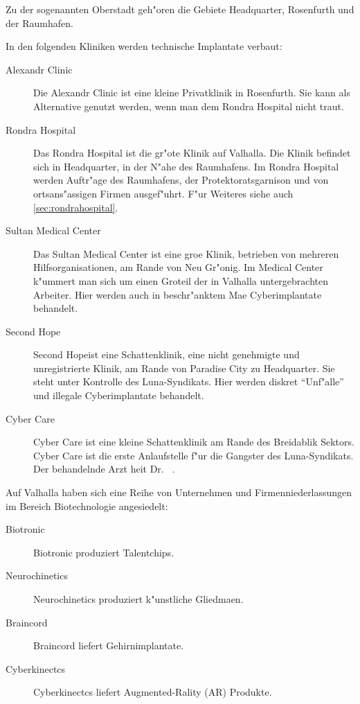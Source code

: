 Zu der sogenannten Oberstadt geh"oren die Gebiete Headquarter, Rosenfurth und der Raumhafen.


In den folgenden Kliniken werden technische Implantate verbaut:

\begin{description}
    \item [Alexandr Clinic] Die Alexandr Clinic ist eine kleine Privatklinik in Rosenfurth. Sie kann als Alternative genutzt werden, wenn 
        man dem Rondra Hospital nicht traut.
    \item [Rondra Hospital] Das Rondra Hospital ist die gr"o\3te Klinik auf Valhalla. Die Klinik befindet sich in Headquarter, in der N"ahe 
        des Raumhafens. Im Rondra Hospital werden Auftr"age des Raumhafens, der Protektoratsgarnison und von ortsans"assigen Firmen ausgef"uhrt. F"ur Weiteres siehe auch \cref{sec:rondrahospital}. 
    \item [Sultan Medical Center] Das Sultan Medical Center ist eine gro\3e Klinik, betrieben von mehreren Hilfsorganisationen, am Rande von 
        Neu Gr"onig. Im Medical Center k"ummert man sich um einen Gro\3teil der in Valhalla untergebrachten Arbeiter. Hier werden auch in beschr"anktem Ma\3e Cyberimplantate behandelt.
    \item [Second Hope] Second Hopeist eine Schattenklinik, eine nicht genehmigte und unregistrierte Klinik, am Rande von Paradise City zu 
        Headquarter. Sie steht unter Kontrolle des Luna-Syndikats. Hier werden diskret ``Unf"alle'' und illegale Cyberimplantate behandelt.
    \item [ Cyber Care] Cyber Care ist eine kleine Schattenklinik am Rande des Breidablik Sektors. Cyber Care ist die erste 
        Anlaufstelle f"ur die Gangster des Luna-Syndikats. Der behandelnde Arzt hei\3t Dr.~ .
\end{description}


Auf Valhalla haben sich eine Reihe von Unternehmen und Firmenniederlassungen im Bereich Biotechnologie angesiedelt:

\begin{description}
    \item [Biotronic] Biotronic produziert Talentchips.
    \item [Neurochinetics] Neurochinetics produziert k"unstliche Gliedma\3en.
    \item [Braincord]  Braincord liefert Gehirnimplantate.
    \item [Cyberkinectcs] Cyberkinectcs liefert Augmented-Rality (AR) Produkte.
\end{description}

